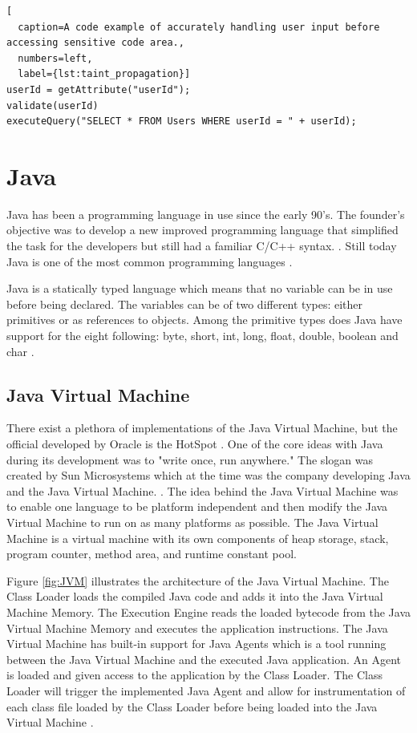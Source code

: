 \hfill
\begin{minipage}[H]{\linewidth}
\begin{lstlisting}[
  caption=A code example of accurately handling user input before accessing sensitive code area.,
  numbers=left,
  label={lst:taint_propagation}]
userId = getAttribute("userId");
validate(userId)
executeQuery("SELECT * FROM Users WHERE userId = " + userId);
\end{lstlisting}
\end{minipage}
\hfill



\section{Java}
\label{JavaInstrumentation}
Java has been a programming language in use since the early 90's. The founder's objective was to develop a new improved programming language that simplified the task for the developers but still had a familiar C/C++ syntax. \parencite{OracleVoice}. Still today Java is one of the most common programming languages \parencite{octoverse}.

Java is a statically typed language which means that no variable can be in use before being declared. The variables can be of two different types: either primitives or as references to objects. Among the primitive types does Java have support for the eight following: byte, short, int, long, float, double, boolean and char \parencite{primjav}.



\subsection{Java Virtual Machine}
There exist a plethora of implementations of the Java Virtual Machine, but the official developed by Oracle is the HotSpot \parencite{hotSpot}. One of the core ideas with Java during its development was to "write once, run anywhere." The slogan was created by Sun Microsystems which at the time was the company developing Java and the Java Virtual Machine. \parencite{Craig_2006}. The idea behind the Java Virtual Machine was to enable one language to be platform independent and then modify the Java Virtual Machine to run on as many platforms as possible. The Java Virtual Machine is a virtual machine with its own components of heap storage, stack, program counter, method area, and runtime constant pool.

Figure \ref{fig:JVM} illustrates the architecture of the Java Virtual Machine. The Class Loader loads the compiled Java code and adds it into the Java Virtual Machine Memory. The Execution Engine reads the loaded bytecode from the Java Virtual Machine Memory and executes the application instructions. The Java Virtual Machine has built-in support for Java Agents which is a tool running between the Java Virtual Machine and the executed Java application. An Agent is loaded and given access to the application by the Class Loader. The Class Loader will trigger the implemented Java Agent and allow for instrumentation of each class file loaded by the Class Loader before being loaded into the Java Virtual Machine \parencite{venners_1999, instru}.

